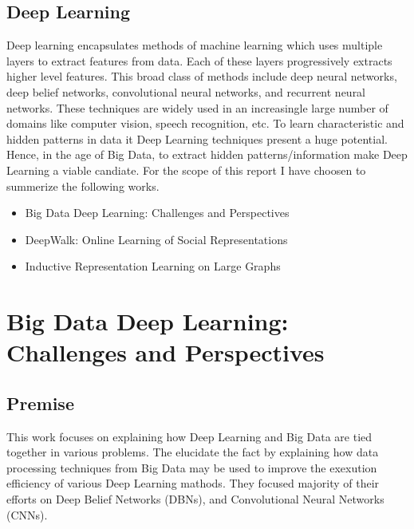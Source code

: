 \documentclass[12pt]{extarticle}
\begin{document}
\subsection{Deep Learning}
Deep learning encapsulates methods of machine learning which uses multiple layers
to extract features from data.
%
Each of these layers progressively extracts higher level features.
%
This broad class of methods include deep neural networks, deep belief networks,
convolutional neural networks, and recurrent neural networks.
%
These techniques are widely used in an increasingle large number of domains like
computer vision, speech recognition, etc.
%
To learn characteristic and hidden patterns in data it Deep Learning techniques
present a huge potential.
\\
Hence, in the age of Big Data, to extract hidden patterns/information make
Deep Learning a viable candiate.
For the scope of this report I have choosen to summerize the following works.

\begin{itemize}
\item Big Data Deep Learning: Challenges and Perspectives~\cite{chen2014big}
\item DeepWalk: Online Learning of Social Representations~\cite{perozzi2014deepwalk}
\item Inductive Representation Learning on Large Graphs~\cite{hamilton2017inductive}
\end{itemize}

\section{Big Data Deep Learning: Challenges and Perspectives}
\subsection{Premise}
This work focuses on explaining how Deep Learning and Big Data are tied together
in various problems.
%
The elucidate the fact by explaining how data processing techniques from Big Data
may be used to improve the exexution efficiency of various Deep Learning mathods.
%
They focused majority of their efforts on Deep Belief Networks (DBNs), and Convolutional
Neural Networks (CNNs).
\end{document}
